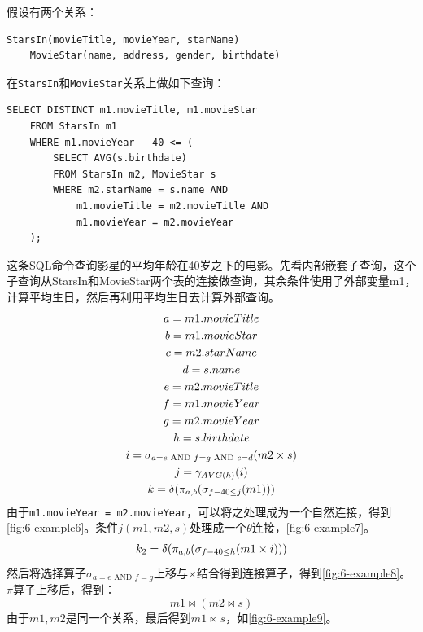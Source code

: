\begin{example}
    假设有两个关系：
\begin{lstlisting}[style=verbose]
    StarsIn(movieTitle, movieYear, starName)
    MovieStar(name, address, gender, birthdate)
\end{lstlisting}

    在\texttt{StarsIn}和\texttt{MovieStar}关系上做如下查询：
\begin{lstlisting}[style=verbose]
    SELECT DISTINCT m1.movieTitle, m1.movieStar
    FROM StarsIn m1
    WHERE m1.movieYear - 40 <= (
        SELECT AVG(s.birthdate)
        FROM StarsIn m2, MovieStar s
        WHERE m2.starName = s.name AND
            m1.movieTitle = m2.movieTitle AND
            m1.movieYear = m2.movieYear
    );
\end{lstlisting}

    这条SQL命令查询影星的平均年龄在40岁之下的电影。先看内部嵌套子查询，这个子查询从StarsIn和MovieStar两个表的连接做查询，其余条件使用了外部变量m1，计算平均生日，然后再利用平均生日去计算外部查询。
    \begin{gather}
        a=m1.movieTitle \notag \\
        b=m1.movieStar \notag \\
        c=m2.starName \notag \\
        d=s.name \notag \\
        e=m2.movieTitle \notag \\
        f=m1.movieYear \notag \\
        g=m2.movieYear \notag \\
        h=s.birthdate \notag \\
        i=\sigma_{a=e \text{ AND } f=g \text{ AND } c=d }(m2 \times s) \notag \\
        j=\gamma_{AVG(h)}(i) \notag \\
        k=\delta(\pi_{a,b}(\sigma_{f-40 \le j}(m1))) \notag
    \end{gather}
    由于\texttt{m1.movie\-Year = m2.movieYear}，可以将之处理成为一个自然连接，得到\figurename\ref{fig:6-example6}。条件$j(m1,m2,s)$处理成一个$\theta$连接，\figurename\ref{fig:6-example7}。
    \begin{gather}
        k_2=\delta(\pi_{a,b}(\sigma_{f-40 \le h}(m1 \times i))) \notag
    \end{gather}
    然后将选择算子$\sigma_{a=e \text{ AND } f=g}$上移与$\times$结合得到连接算子，得到\figurename\ref{fig:6-example8}。$\pi$算子上移后，得到：
    $$m1 \bowtie (m2 \bowtie s)$$
    由于$m1,m2$是同一个关系，最后得到$m1 \bowtie s$，如\figurename\ref{fig:6-example9}。
\end{example}

